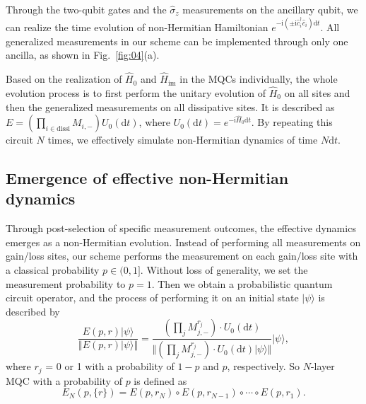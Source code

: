 \documentclass[longbibliography, aps, prx, amsmath, amssymb, amsfonts, twocolumn,superscriptaddress, footinbib]{revtex4-1}
\begin{document}
	{Through the two-qubit gates and the $\hat{\sigma}_z$ measurements on the ancillary qubit, we can realize the time evolution of non-Hermitian Hamiltonian $e^{-\mathrm{i} (\pm \mathrm{i} \hat{c}_i^{\dagger}\hat{c}_i) \mathrm{d}t}$. All generalized measurements in our scheme can be implemented through only one ancilla, as shown in Fig.~\ref{fig:04}(a).}
	
	{Based on the realization of $\hat{H}_0$ and $\hat{H}_{\text{im}}$ in the MQCs individually, the whole evolution process is to first perform the unitary evolution of $\hat{H}_0$ on all sites and then the generalized measurements on all dissipative sites. It is described as $E=(\prod_{i\in \text{dissi}} M_{i,-}) U_{0}(\mathrm{d} t)$, where $U_{0}(\mathrm{d}t)=e^{-\mathrm{i}\hat{H}_0 \mathrm{d}t}$. By repeating this circuit $N$ times, we effectively simulate non-Hermitian dynamics of time $N\mathrm{d}t$.}
	
	\subsection{{Emergence of effective non-Hermitian dynamics}}
	\label{sec:effective_dynamics}
	
	{Through post-selection of specific measurement outcomes, the effective dynamics emerges as a non-Hermitian evolution.} {Instead of performing all measurements on gain/loss sites, our scheme performs the measurement on each gain/loss site with a classical probability $p\in(0,1]$. Without loss of generality, we set the measurement probability to $p=1$. Then we obtain a probabilistic quantum circuit operator, and the process of performing it on an initial state $\vert \psi \rangle$ is described by}
	\begin{equation}
		{\frac{E(p,r) \vert \psi \rangle}{\Vert E(p,r) \vert \psi \rangle \Vert} = \frac{(\prod_j M_{j,-}^{r_j}) \cdot U_0(\mathrm{d}t)}{\Vert (\prod_j M_{j,-}^{r_j}) \cdot U_0(\mathrm{d}t) \vert \psi \rangle \Vert} \vert \psi \rangle,}
	\end{equation}
	{where $r_j$ = 0 or 1 with a probability of $1-p$ and $p$, respectively. So $N$-layer MQC with a probability of $p$ is defined as}
	\begin{equation}
		{E_N(p,\{r\}) = E(p, r_N) \circ E(p, r_{N-1}) \circ \cdots \circ E(p, r_1).}
	\end{equation}
	
\end{document}
